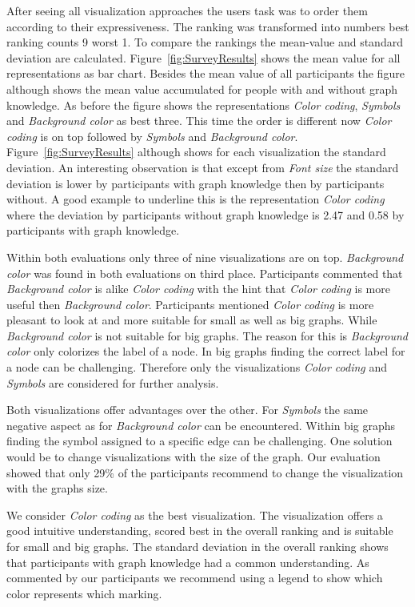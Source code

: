 \documentclass{llncs}
\begin{document}
After seeing all visualization approaches the users task was to order them according to their expressiveness. The ranking was transformed into numbers best ranking counts 9 worst 1. To compare the rankings the mean-value and standard deviation are calculated. Figure~\ref{fig:SurveyResults} shows the mean value for all representations as bar chart. Besides the mean value of all participants the figure although shows the mean value accumulated for people with and without graph knowledge. As before the figure shows the representations \emph{Color coding}, \emph{Symbols} and \emph{Background color} as best three. This time the order is different now \emph{Color coding} is on top followed by \emph{Symbols} and \emph{Background color}. Figure~\ref{fig:SurveyResults} although shows for each visualization the standard deviation. An interesting observation is that except from \emph{Font size} the standard deviation is lower by participants with graph knowledge then by participants without. A good example to underline this is the representation \emph{Color coding} where the deviation by participants without graph knowledge is 2.47 and 0.58 by participants with graph knowledge.

Within both evaluations only three of nine visualizations are on top. \emph{Background color} was found in both evaluations on third place. Participants commented that \emph{Background color} is alike \emph{Color coding} with the hint that \emph{Color coding} is more useful then \emph{Background color}. Participants mentioned \emph{Color coding} is more pleasant to look at and more suitable for small as well as big graphs. While \emph{Background color} is not suitable for big graphs. The reason for this is \emph{Background color} only colorizes the label of a node. In big graphs finding the correct label for a node can be challenging. Therefore only the visualizations \emph{Color coding} and \emph{Symbols} are considered for further analysis.

Both visualizations offer advantages over the other. For \emph{Symbols} the same negative aspect as for \emph{Background color} can be encountered. Within big graphs finding the symbol assigned to a specific edge can be challenging. One solution would be to change visualizations with the size of the graph. Our evaluation showed that only 29\% of the participants recommend to change the visualization with the graphs size.

We consider \emph{Color coding} as the best visualization. The visualization offers a good intuitive understanding, scored best in the overall ranking and is suitable for small and big graphs. The standard deviation in the overall ranking shows that participants with graph knowledge had a common understanding. As commented by our participants we recommend using a legend to show which color represents which marking.
\end{document}
